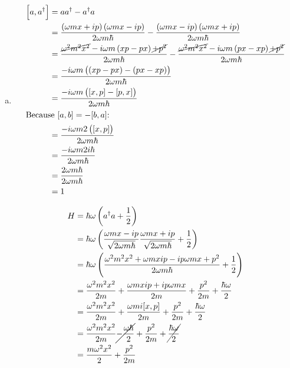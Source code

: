 \documentclass[a4paper,german,12pt,smallheadings]{scrartcl}
\begin{document}
\begin{enumerate}[a)]
  \item
    \begin{align*}
      \sbr{a,a^\dagger} &= aa^\dagger - a^\dagger a \\
      &= \frac{\del{\omega m x + i p}\del{\omega m x - ip}}{2 \omega m \hbar} - \frac{\del{\omega m x - ip}\del{\omega m x + i p}}{2 \omega m \hbar} \\
      &= \frac{\cancel{\omega^2 m^2 x^2} - i \omega m \del{xp -px} \cancel{+ p^2}}{2 \omega m \hbar} -
          \frac{\cancel{\omega^2 m^2 x^2} - i \omega m \del{px-xp} \cancel{+ p^2}}{2 \omega m \hbar} \\
          &= \frac{-i \omega m \del{\del{xp-px} - \del{px-xp}}}{2 \omega m \hbar} \\
          &= \frac{-i \omega m \del{[x,p] - [p,x]}}{2 \omega m \hbar} \\
          \intertext{Because $[a,b] = -[b,a]$:}
          &= \frac{-i \omega m 2\del{[x,p]}}{2 \omega m \hbar} \\
          &= \frac{-i \omega m 2 i \hbar}{2 \omega m \hbar} \\
          &= \frac{2 \omega m \hbar}{2 \omega m \hbar} \\
          &= 1
    \end{align*}

    \begin{align*}
      H &= \hbar \omega \del{a^\dagger a + \frac{1}{2}} \\
        &= \hbar \omega \del{\frac{\omega m x - i p}{\sqrt{2 \omega m \hbar}} \frac{\omega m x + i p}{\sqrt{2 \omega m \hbar}} + \frac{1}{2}} \\
        &= \hbar \omega \del{\frac{\omega^2m^2x^2 + \omega m x ip - ip\omega m x + p^2}{2 \omega m \hbar} + \frac{1}{2}} \\
        &= \frac{\omega^2 m^2 x^2}{2 m} + \frac{\omega m x i p + i p \omega m x}{2m} + \frac{p^2}{2m} + \frac{\hbar \omega}{2} \\
        &= \frac{\omega^2 m^2 x^2}{2 m} + \frac{\omega m i [x,p]}{2m} + \frac{p^2}{2m} + \frac{\hbar \omega}{2} \\
        &= \frac{\omega^2 m^2 x^2}{2 m} \cancel{- \frac{\omega \hbar}{2}} + \frac{p^2}{2m} + \cancel{\frac{\hbar \omega}{2}} \\
        &= \frac{m \omega^2 x^2}{2} + \frac{p^2}{2m}
    \end{align*}

\end{enumerate}
\end{document}
